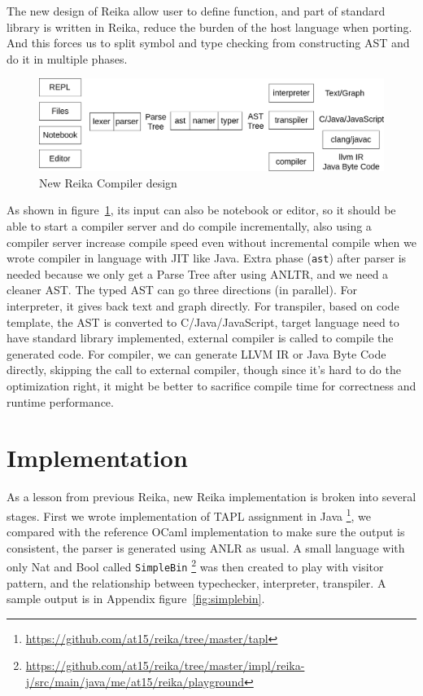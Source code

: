 \documentclass{article}
\begin{document}
The new design of Reika allow user to define function, and part of standard library is written in Reika,
reduce the burden of the host language when porting.
And this forces us to split symbol and type checking from constructing AST and do it in multiple phases.

\begin{figure}[h]
    \centering
    \includegraphics[width=\columnwidth]{reika-compiler}
    \caption{New Reika Compiler design}
    \label{fig:reika-compiler}
\end{figure}

As shown in figure~\ref{fig:reika-compiler}, its input can also be notebook or editor,
so it should be able to start a compiler server and do compile incrementally,
also using a compiler server increase compile speed even without incremental compile when we wrote compiler in language with JIT like Java.
Extra phase (\verb+ast+) after parser is needed because we only get a Parse Tree after using ANLTR, and we need a cleaner AST.
The typed AST can go three directions (in parallel).
For interpreter, it gives back text and graph directly.
For transpiler, based on code template, the AST is converted to C/Java/JavaScript,
target language need to have standard library implemented, external compiler is called to compile the generated code.
For compiler, we can generate LLVM IR or Java Byte Code directly, skipping the call to external compiler,
though since it's hard to do the optimization right, it might be better to sacrifice compile time for correctness and runtime performance.


\section{Implementation}
\label{sec:implementation}

As a lesson from previous Reika, new Reika implementation is broken into several stages.
First we wrote implementation of TAPL assignment in Java \footnote{\url{https://github.com/at15/reika/tree/master/tapl}}, we compared with the reference OCaml implementation
to make sure the output is consistent, the parser is generated using ANLR as usual.
A small language with only Nat and Bool called \verb+SimpleBin+
\footnote{\url{https://github.com/at15/reika/tree/master/impl/reika-j/src/main/java/me/at15/reika/playground}}
was then created to play with visitor pattern,
and the relationship between typechecker, interpreter, transpiler.
A sample output is in Appendix figure~\ref{fig:simplebin}.
\end{document}
